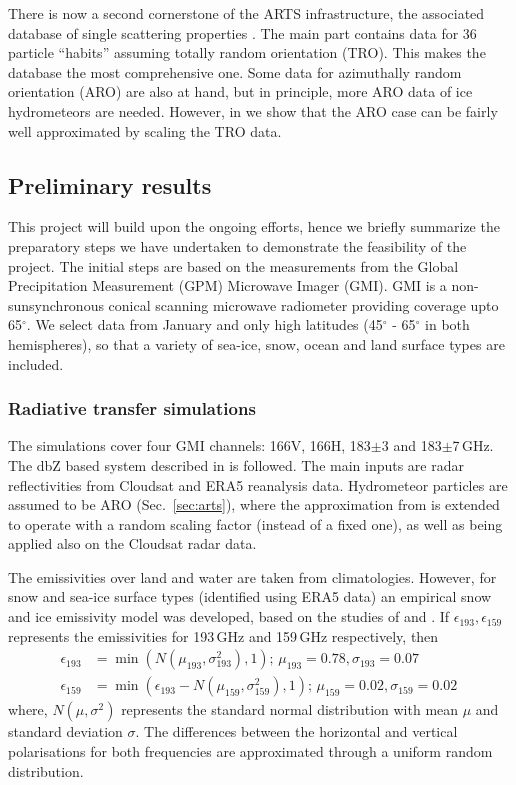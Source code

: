 \documentclass[12pt,oneside,a4paper]{article}
\begin{document}
There is now a second cornerstone of the ARTS infrastructure, the associated
database of single scattering properties \citep{eriksson:agene:18}. The main
part contains data for 36 particle ``habits'' assuming totally random
orientation (TRO). This makes the database the most comprehensive one. Some
data for azimuthally random orientation (ARO) are also at hand, but in 
principle, more ARO data of ice hydrometeors are needed. However, in \citet{barlakas:intro:21} we show that the ARO case can be fairly well approximated by scaling the TRO data.

\subsection{Preliminary results}
%
This project will build upon the ongoing efforts, hence we briefly summarize
the preparatory steps we have undertaken to demonstrate the feasibility of the
project. The initial steps are based on the measurements from the Global
Precipitation Measurement (GPM) Microwave Imager (GMI). GMI is a
non-sunsynchronous conical scanning microwave radiometer providing coverage
upto 65$^{\circ}$. We select data from January and only high latitudes
(45$^{\circ}$ - 65$^{\circ}$ in both hemispheres), so that a variety of
sea-ice, snow, ocean and land surface types are included.

\subsubsection{Radiative transfer simulations}
%
\label{sec:radiative_transfer}
The simulations cover four GMI channels: 166V, 166H, 183$\pm$3
and 183$\pm$7\,GHz. The dbZ based
system described in \citet{ekelund:using:20} is followed. The
main inputs are radar reflectivities from Cloudsat and ERA5 reanalysis data.
Hydrometeor particles are assumed to be ARO (Sec.~\ref{sec:arts}), where the
approximation from \citet{barlakas:intro:21} is extended to operate with 
a random scaling factor (instead of a fixed one), as well as being applied also
on the Cloudsat radar data.

The emissivities over land and water are taken from climatologies. However, for
snow and sea-ice surface types (identified using ERA5 data) an empirical snow
and ice emissivity model was developed, based on the studies of
\citet{harlow:2009:milli} and \citet{hewison:2002:airbo}. If
$\epsilon_{193}, \epsilon_{159}$ represents the emissivities for 193\,GHz and
159\,GHz respectively, then
\begin{align}
\epsilon_{193}& = \min({N(\mu_{193}, \sigma_{193}^{2}), 1});\, \mu_{193} = 0.78, \sigma_{193} = 0.07 \label{eq:1}\\
\epsilon_{159}& = \min(\epsilon_{193} - N(\mu_{159}, \sigma_{159}^{2}), 1) ;\,  \mu_{159} = 0.02, \sigma_{159} = 0.02\,\label{eq:2}
\end{align}
where, $N(\mu, \sigma^{2})$ represents the standard normal distribution with
mean $\mu$ and standard deviation $\sigma$. The differences between the
horizontal and vertical polarisations for both frequencies are 
approximated through a uniform random distribution.
\end{document}
